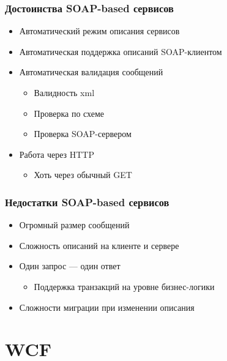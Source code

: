 \documentclass[xetex,mathserif,serif]{beamer}
\begin{document}
	\begin{frame}
		\frametitle{Достоинства SOAP-based сервисов}
		\begin{itemize}
			\item Автоматический режим описания сервисов
			\item Автоматическая поддержка описаний SOAP-клиентом
			\item Автоматическая валидация сообщений
			\begin{itemize}
				\item Валидность xml
				\item Проверка по схеме
				\item Проверка SOAP-сервером
			\end{itemize}
			\item Работа через HTTP
			\begin{itemize}
				\item Хоть через обычный GET
			\end{itemize}
		\end{itemize}
	\end{frame}

	\begin{frame}
		\frametitle{Недостатки SOAP-based сервисов}
		\begin{itemize}
			\item Огромный размер сообщений
			\item Сложность описаний на клиенте и сервере
			\item Один запрос --- один ответ
			\begin{itemize}
				\item Поддержка транзакций на уровне бизнес-логики
			\end{itemize}
			\item Сложности миграции при изменении описания
		\end{itemize}
	\end{frame}

	\section{WCF}
\end{document}
